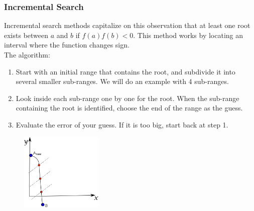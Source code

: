 \documentclass{if-beamer}
\begin{document}
\begin{frame}
\frametitle{Incremental Search}
Incremental search methods capitalize on this observation that at least one root exists between $a$ and $b$ if $f(a)f(b)<0$. This method works by locating an interval where the function changes sign.  \\
\vspace{0.25cm}
The algorithm:
\begin{enumerate}
	\item Start with an initial range that contains the root, and subdivide it into several smaller sub-ranges. We will do an example with 4 sub-ranges.
	\item Look inside each sub-range one by one for the root. When the sub-range containing the root is identified, choose the end of the range as the guess.
	\item Evaluate the error of your guess. If it is too big, start back at step 1. 
\end{enumerate}
\begin{figure}
	\centering
	\includegraphics[width = 0.35\textwidth]{figures/incremental2}
\end{figure}
\end{frame}
\end{document}
